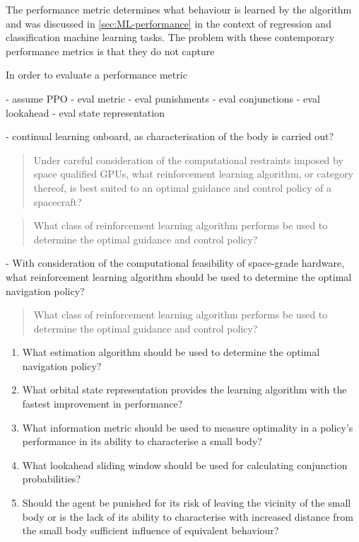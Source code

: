 The performance metric determines what behaviour is learned by the algorithm and was discussed in \autoref{sec:ML-performance} in the context of regression and classification machine learning tasks. The problem with these contemporary performance metrics is that they do not capture

In order to evaluate a performance metric

- assume PPO
- eval metric
- eval punishments
- eval conjunctions
- eval lookahead
- eval state representation


- continual learning onboard, as characterisation of the body is carried out?


\begin{quote}
    Under careful consideration of the computational restraints imposed by space qualified \glspl{GPU}, what reinforcement learning algorithm, or category thereof, is best suited to an optimal guidance and control policy of a spacecraft?
\end{quote}

\begin{quote}
    What class of reinforcement learning algorithm performs be used to determine the optimal guidance and control policy?
\end{quote}


- With consideration of the computational feasibility of space-grade hardware, what reinforcement learning algorithm should be used to determine the optimal navigation policy?

\begin{quote}
    What class of reinforcement learning algorithm performs be used to determine the optimal guidance and control policy?
\end{quote}

\begin{enumerate}
    \item What estimation algorithm should be used to determine the optimal navigation policy?
    \item What orbital state representation provides the learning algorithm with the fastest improvement in performance?
    \item What information metric should be used to measure optimality in a policy's performance in its ability to characterise a small body?
    \item What lookahead sliding window should be used for calculating conjunction probabilities?
    \item Should the agent be punished for its risk of leaving the vicinity of the small body or is the lack of its ability to characterise with increased distance from the small body sufficient influence of equivalent behaviour?
\end{enumerate}

